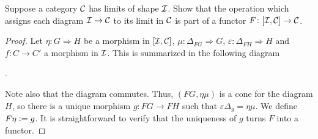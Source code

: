 \begin{exercise}{44}
    Suppose a category $\mathcal{C}$ has limits of shape $\mathcal{I}$. Show that the operation which assigns each diagram $\mathcal{I}\to\mathcal{C}$ to its limit in $\mathcal{C}$ is part of a functor $F\colon[\mathcal{I}, \mathcal{C}]\to\mathcal{C}$. 
\end{exercise}
\begin{solution}
    \begin{proof}
        Let $\eta\colon G\Rightarrow H$ be a morphism in $[\mathcal{I}, \mathcal{C}]$, $\mu\colon\Delta_{FG}\Rightarrow G$, $\varepsilon\colon\Delta_{FH}\Rightarrow H$ and $f\colon C\to C'$ a morphism in $\mathcal{I}$.
        This is summarized in the following diagram
        \begin{center}
            .
        \end{center}
        Note also that the diagram commutes. Thus, $(FG,\eta\mu)$ is a cone for the diagram $H$, so there is a unique morphism $g\colon FG\to FH$ such that $\varepsilon\Delta_g=\eta\mu$. We define $F\eta\vcentcolon= g$.
        It is straightforward to verify that the uniqueness of $g$ turns $F$ into a functor.
    \end{proof}
\end{solution}

